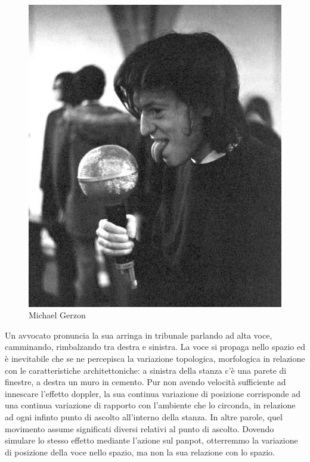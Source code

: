 \begin{figure}[t!]
\centering
\includegraphics[width=0.99\columnwidth]{CAPITOLI/0300/IMG/MAG-licking-G-web.jpg}
\caption[]{Michael Gerzon}
\label{ph:mg1}
\end{figure}

Un avvocato pronuncia la sua arringa in tribunale parlando ad alta voce,
camminando, rimbalzando tra destra e sinistra. La voce si propaga nello spazio
ed è inevitabile che se ne percepisca la variazione topologica, morfologica in
relazione con le caratteristiche architettoniche: a sinistra della stanza c'è
una parete di finestre, a destra un muro in cemento. Pur non avendo velocità
sufficiente ad innescare l'effetto doppler, la sua continua variazione di
posizione corrisponde ad una continua variazione di rapporto con l'ambiente che
lo circonda, in relazione ad ogni infinto punto di ascolto all'interno della
stanza. In altre parole, quel movimento assume significati diversi relativi al
punto di ascolto. Dovendo simulare lo stesso effetto mediante l'azione sul panpot, otterremmo la
variazione di posizione della voce nello spazio, ma non la sua relazione con lo
spazio.

